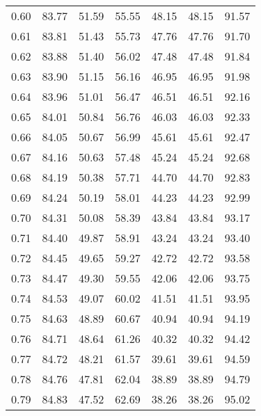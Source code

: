 \begin{tabular}{|c|c|c|c|c|c|c|}
      0.60 &     83.77 &     51.59 &      55.55 &   48.15 &      48.15 &         91.57 \\
      0.61 &     83.81 &     51.43 &      55.73 &   47.76 &      47.76 &         91.70 \\
      0.62 &     83.88 &     51.40 &      56.02 &   47.48 &      47.48 &         91.84 \\
      0.63 &     83.90 &     51.15 &      56.16 &   46.95 &      46.95 &         91.98 \\
      0.64 &     83.96 &     51.01 &      56.47 &   46.51 &      46.51 &         92.16 \\
      0.65 &     84.01 &     50.84 &      56.76 &   46.03 &      46.03 &         92.33 \\
      0.66 &     84.05 &     50.67 &      56.99 &   45.61 &      45.61 &         92.47 \\
      0.67 &     84.16 &     50.63 &      57.48 &   45.24 &      45.24 &         92.68 \\
      0.68 &     84.19 &     50.38 &      57.71 &   44.70 &      44.70 &         92.83 \\
      0.69 &     84.24 &     50.19 &      58.01 &   44.23 &      44.23 &         92.99 \\
      0.70 &     84.31 &     50.08 &      58.39 &   43.84 &      43.84 &         93.17 \\
      0.71 &     84.40 &     49.87 &      58.91 &   43.24 &      43.24 &         93.40 \\
      0.72 &     84.45 &     49.65 &      59.27 &   42.72 &      42.72 &         93.58 \\
      0.73 &     84.47 &     49.30 &      59.55 &   42.06 &      42.06 &         93.75 \\
      0.74 &     84.53 &     49.07 &      60.02 &   41.51 &      41.51 &         93.95 \\
      0.75 &     84.63 &     48.89 &      60.67 &   40.94 &      40.94 &         94.19 \\
      0.76 &     84.71 &     48.64 &      61.26 &   40.32 &      40.32 &         94.42 \\
      0.77 &     84.72 &     48.21 &      61.57 &   39.61 &      39.61 &         94.59 \\
      0.78 &     84.76 &     47.81 &      62.04 &   38.89 &      38.89 &         94.79 \\
      0.79 &     84.83 &     47.52 &      62.69 &   38.26 &      38.26 &         95.02 \\

\end{tabular}
